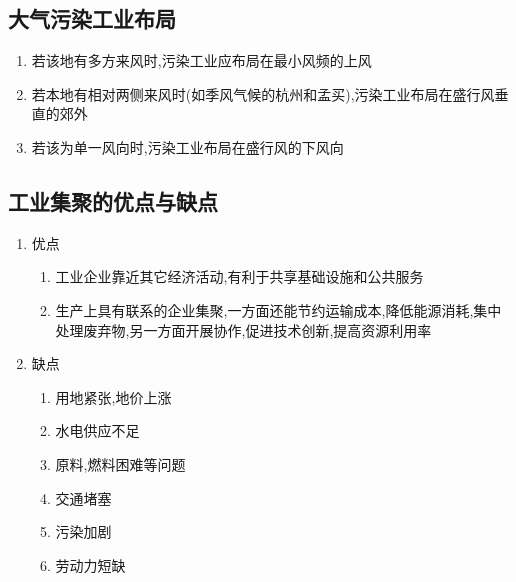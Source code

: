 \documentclass[a4paper]{article}
\begin{document}
    \subsection{大气污染工业布局}
    \begin{enumerate}
        \item 若该地有多方来风时,污染工业应布局在最小风频的上风
        \item 若本地有相对两侧来风时(如季风气候的杭州和孟买),污染工业布局在盛行风垂直的郊外
        \item 若该为单一风向时,污染工业布局在盛行风的下风向
    \end{enumerate}
    \subsection{工业集聚的优点与缺点}
    \begin{enumerate}
        \item 优点
        \begin{enumerate}
            \item 工业企业靠近其它经济活动,有利于共享基础设施和公共服务
            \item 生产上具有联系的企业集聚,一方面还能节约运输成本,降低能源消耗,集中处理废弃物,另一方面开展协作,促进技术创新,提高资源利用率
        \end{enumerate}
        \item 缺点
        \begin{enumerate}
            \item 用地紧张,地价上涨
            \item 水电供应不足
            \item 原料,燃料困难等问题
            \item 交通堵塞
            \item 污染加剧
            \item 劳动力短缺
        \end{enumerate}
    \end{enumerate}
\end{document}
